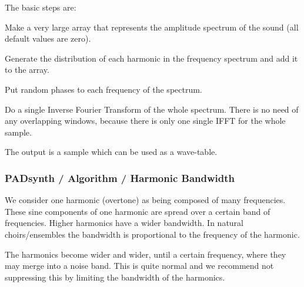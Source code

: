    The basic steps are:

   \begin{enumber}
      \item Make a very large array that represents the amplitude spectrum of
         the sound (all default values are zero).
      \item Generate the distribution of each harmonic in the frequency
         spectrum and add it to the array.
      \item Put random phases to each frequency of the spectrum.
      \item Do a single Inverse Fourier Transform of the whole spectrum. There
         is no need of any overlapping windows, because there is only one
         single IFFT for the whole sample.
   \end{enumber}

   The output is a sample which can be used as a wave-table.


\subsubsection{PADsynth / Algorithm / Harmonic Bandwidth}
\label{subsubsec:padsynth_algorithm_harmonic_bandwidth}

   We consider one harmonic (overtone) as being composed of many frequencies.
   These sine components of one harmonic are spread over a certain band of
   frequencies.  Higher harmonics have a wider bandwidth. In natural
   choirs/ensembles the bandwidth is proportional to the frequency of the
   harmonic.

%


   The harmonics become wider and wider, until a certain frequency, where
   they may merge into a noise band. This is quite normal and we recommend not
   suppressing this by limiting the bandwidth of the harmonics.


